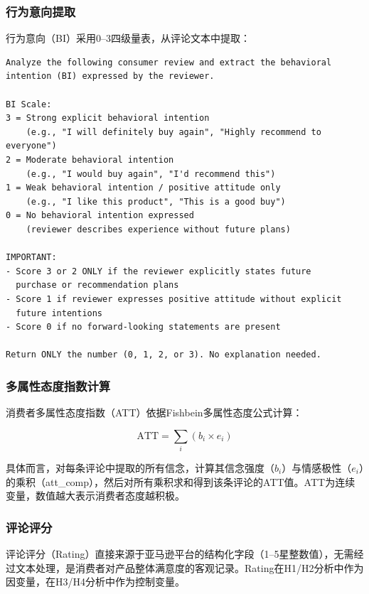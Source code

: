 \subsubsection{行为意向提取}

行为意向（BI）采用0--3四级量表，从评论文本中提取：

\begin{lstlisting}[language={}, basicstyle=\small\ttfamily, breaklines=true,
  caption={行为意向提取提示词（英文原版）}]
Analyze the following consumer review and extract the behavioral
intention (BI) expressed by the reviewer.

BI Scale:
3 = Strong explicit behavioral intention
    (e.g., "I will definitely buy again", "Highly recommend to everyone")
2 = Moderate behavioral intention
    (e.g., "I would buy again", "I'd recommend this")
1 = Weak behavioral intention / positive attitude only
    (e.g., "I like this product", "This is a good buy")
0 = No behavioral intention expressed
    (reviewer describes experience without future plans)

IMPORTANT:
- Score 3 or 2 ONLY if the reviewer explicitly states future
  purchase or recommendation plans
- Score 1 if reviewer expresses positive attitude without explicit
  future intentions
- Score 0 if no forward-looking statements are present

Return ONLY the number (0, 1, 2, or 3). No explanation needed.
\end{lstlisting}

\subsubsection{多属性态度指数计算}

消费者多属性态度指数（ATT）依据Fishbein多属性态度公式计算：

\begin{equation}
\text{ATT} = \sum_{i}(b_i \times e_i)
\end{equation}

具体而言，对每条评论中提取的所有信念，计算其信念强度（$b_i$）与情感极性（$e_i$）的乘积（att\_comp），然后对所有乘积求和得到该条评论的ATT值。ATT为连续变量，数值越大表示消费者态度越积极。

\subsubsection{评论评分}

评论评分（Rating）直接来源于亚马逊平台的结构化字段（1--5星整数值），无需经过文本处理，是消费者对产品整体满意度的客观记录。Rating在H1/H2分析中作为因变量，在H3/H4分析中作为控制变量。


